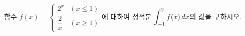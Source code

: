 함수 $f(x)=\begin{cases} 2^x & (x\le 1) \\ \dfrac{2}{x} & (x\ge 1) \end{cases}$에 대하여 정적분 $\displaystyle\int_{-1}^{2}f(x)\mkern3mu dx$의 값을 구하시오.
